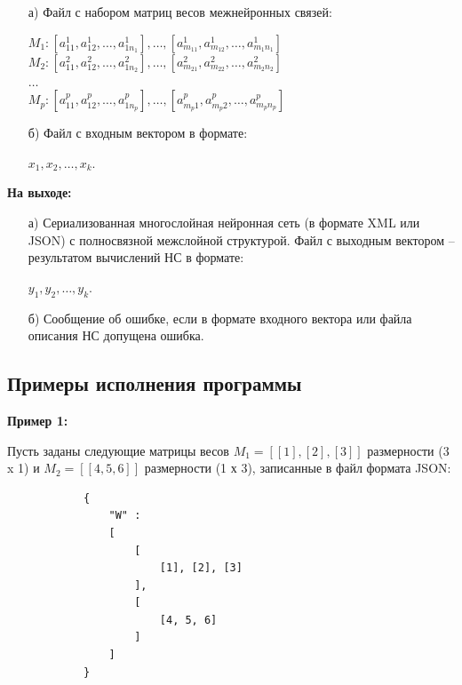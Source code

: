 \documentclass[bachelor, och, otchet]{template}
\begin{document}
    \begin{itemize}
        \item[а)] Файл с набором матриц весов межнейронных связей:
        \begin{center}
            $M_1 : [a_{11}^1, a_{12}^1, \dots, a_{1n_1}^1], \dots, [a_{m_11}^1, a_{m_12}^1, \dots ,a_{m_1n_1}^1]$ \\
            $M_2 : [a_{11}^2, a_{12}^2, \dots, a_{1n_2}^2], \dots, [a_{m_21}^2, a_{m_22}^2, \dots ,a_{m_2n_2}^2]$\\
            $\dots$\\
            $M_p : [a_{11}^p, a_{12}^p, \dots, a_{1n_p}^p], \dots, [a_{m_p1}^p, a_{m_p2}^p, \dots,a_{m_pn_p}^p]$ \\                  
        \end{center}
        \item[б)] Файл с входным вектором в формате:
        
        \begin{center}
            $x_1, x_2, \dots, x_k$.
        \end{center}
    \end{itemize}

    \textbf{На выходе:}
        \begin{itemize}
            \item[а)] Сериализованная многослойная нейронная сеть (в формате XML или JSON) с полносвязной межслойной структурой. 
            Файл с выходным вектором -- результатом вычислений НС в формате: 
            \begin{center}
                $y_1, y_2, \dots, y_k.$                
            \end{center}
            \item[б)] Сообщение об ошибке, если в формате входного вектора или файла описания НС допущена 
            ошибка.
        \end{itemize}
        

\subsection{Примеры исполнения программы}

        \textbf{Пример 1:}

        Пусть заданы следующие матрицы весов $M_1 = [[1], [2], [3]]$ размерности (3 x 1)
        и $M_2 = [[4, 5, 6]]$ размерности (1 х 3), записанные в файл формата JSON:
        
        \begin{verbatim}
            {
                "W" : 
                [
                    [
                        [1], [2], [3]
                    ], 
                    [
                        [4, 5, 6]
                    ]
                ]
            }
        \end{verbatim}
\end{document}
